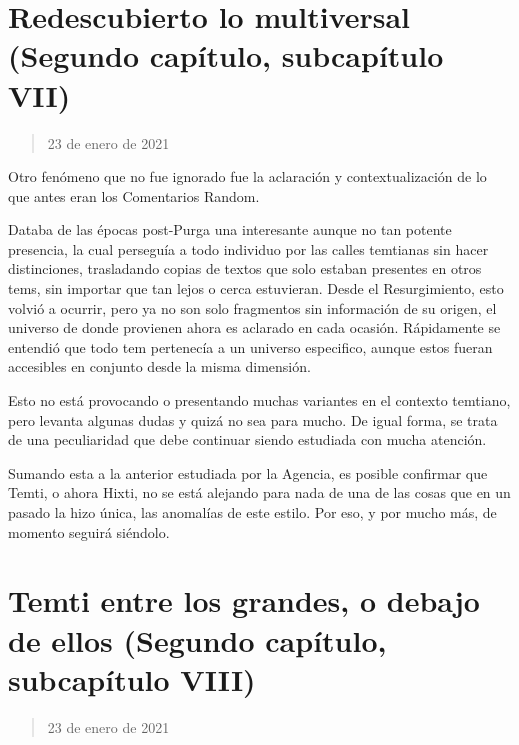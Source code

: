 \documentclass[
  spanish,
]{book}
\begin{document}
\hypertarget{redescubierto-lo-multiversal-segundo-capuxedtulo-subcapuxedtulo-vii}{%
\section{Redescubierto lo multiversal (Segundo capítulo, subcapítulo VII)}\label{redescubierto-lo-multiversal-segundo-capuxedtulo-subcapuxedtulo-vii}}

\begin{quote}
23 de enero de 2021
\end{quote}

Otro fenómeno que no fue ignorado fue la aclaración y contextualización de lo que antes eran los Comentarios Random.

Databa de las épocas post-Purga una interesante aunque no tan potente presencia, la cual perseguía a todo individuo por las calles temtianas sin hacer distinciones, trasladando copias de textos que solo estaban presentes en otros tems, sin importar que tan lejos o cerca estuvieran. Desde el Resurgimiento, esto volvió a ocurrir, pero ya no son solo fragmentos sin información de su origen, el universo de donde provienen ahora es aclarado en cada ocasión. Rápidamente se entendió que todo tem pertenecía a un universo especifico, aunque estos fueran accesibles en conjunto desde la misma dimensión.

Esto no está provocando o presentando muchas variantes en el contexto temtiano, pero levanta algunas dudas y quizá no sea para mucho. De igual forma, se trata de una peculiaridad que debe continuar siendo estudiada con mucha atención.

Sumando esta a la anterior estudiada por la Agencia, es posible confirmar que Temti, o ahora Hixti, no se está alejando para nada de una de las cosas que en un pasado la hizo única, las anomalías de este estilo. Por eso, y por mucho más, de momento seguirá siéndolo.

\hypertarget{temti-entre-los-grandes-o-debajo-de-ellos-segundo-capuxedtulo-subcapuxedtulo-viii}{%
\section{Temti entre los grandes, o debajo de ellos (Segundo capítulo, subcapítulo VIII)}\label{temti-entre-los-grandes-o-debajo-de-ellos-segundo-capuxedtulo-subcapuxedtulo-viii}}

\begin{quote}
23 de enero de 2021
\end{quote}
\end{document}
